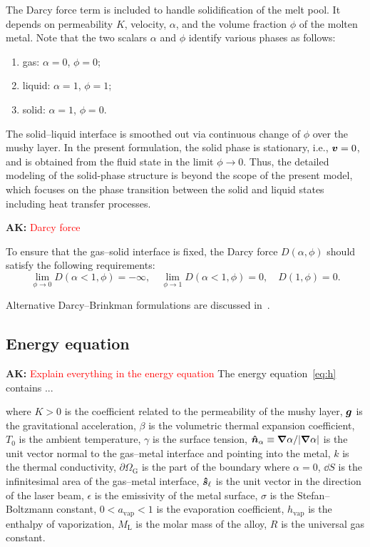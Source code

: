 \documentclass[final]{elsarticle} %
\newcommand{\evapor}[1]{{#1}_\text{vap}}
\newcommand{\liq}{\text{L}}
\newcommand{\gas}{\text{G}}
\newcommand{\laser}{\ell} %
\newcommand{\bv}{\vb*{v}}
\newcommand{\bn}{\vu*{n}}
\newcommand{\bs}{\vu*{s}}
\newcommand{\bg}{\vb*{g}}
\newcommand{\ak}[1] {\textbf{AK:} \textcolor{red}{#1}}
\begin{document}
The Darcy force term is included to handle  solidification of the melt pool. It depends on permeability $K$, velocity, $\alpha$, and the volume fraction $\phi$ of the molten metal. Note that the two scalars $\alpha$ and $\phi$ identify various phases as follows:
\begin{enumerate}[label=\arabic*)]
    \item gas: $\alpha=0$, $\phi=0$;
    \item liquid: $\alpha=1$, $\phi=1$;
    \item solid: $\alpha=1$, $\phi=0$.
\end{enumerate}
The solid--liquid interface is smoothed out via continuous change of $\phi$ over the mushy layer. In the present formulation, the solid phase is stationary, i.e., $\bv=0$, and is obtained from the fluid state in the limit $\phi\to0$. Thus, the detailed modeling of the solid-phase structure is beyond the scope of the present model, which focuses on the phase transition between the solid and liquid states including heat transfer processes.

\ak{Darcy force}

To ensure that the gas--solid interface is fixed,
the Darcy force $D(\alpha,\phi)$ should satisfy the following requirements:
\begin{equation}\label{eq:Darcy}
    \lim_{\phi\to0} D(\alpha<1,\phi) = -\infty, \quad
    \lim_{\phi\to1} D(\alpha<1,\phi) = 0, \quad
    D(1,\phi) = 0.
\end{equation}

Alternative Darcy--Brinkman formulations are discussed in~\cite{le2006interfacial}.

\subsection{Energy equation}
\ak{Explain everything in the energy equation}
The energy equation~\eqref{eq:h} contains ...

where $K>0$ is the coefficient related to the permeability of the mushy layer,
$\bg$ is the gravitational acceleration,
$\beta$ is the volumetric thermal expansion coefficient,
$T_0$ is the ambient temperature,
$\gamma$ is the surface tension,
$\bn_\alpha \equiv \grad\alpha/|\grad\alpha|$ is the unit vector
normal to the gas--metal interface and pointing into the metal,
$k$ is the thermal conductivity,
$\partial\Omega_\gas$ is the part of the boundary where $\alpha = 0$,
$\dd{S}$ is the infinitesimal area of the gas--metal interface,
$\bs_\laser$ is the unit vector in the direction of the laser beam,
$\epsilon$ is the emissivity of the metal surface,
$\sigma$ is the Stefan--Boltzmann constant,
$0 < \evapor{a} < 1$ is the evaporation coefficient,
$\evapor{h}$ is the enthalpy of vaporization,
$M_\liq$ is the molar mass of the alloy,
$R$ is the universal gas constant.
\end{document}
